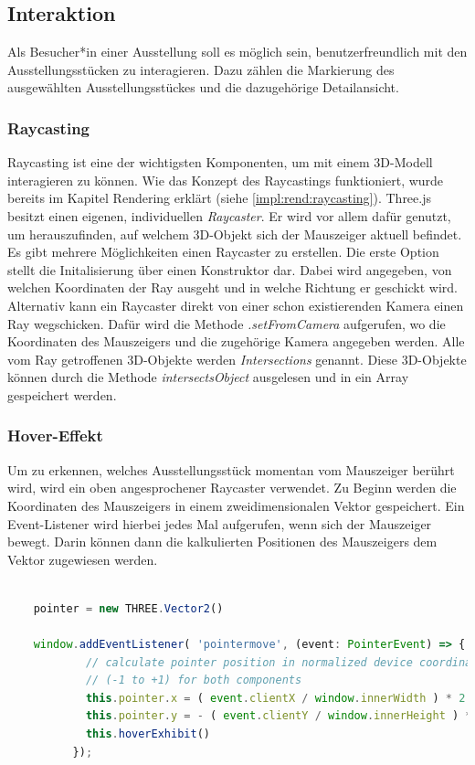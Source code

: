 \subsection{Interaktion}
Als Besucher*in einer Ausstellung soll es möglich sein, benutzerfreundlich mit den Ausstellungsstücken zu interagieren. Dazu zählen die Markierung des ausgewählten Ausstellungsstückes und die dazugehörige Detailansicht. 

\subsubsection{Raycasting}
\label{impl:int:raycasting}
Raycasting ist eine der wichtigsten Komponenten, um mit einem 3D-Modell interagieren zu können. Wie das Konzept des Raycastings funktioniert, wurde bereits im Kapitel Rendering erklärt (siehe \ref{impl:rend:raycasting}). Three.js besitzt einen eigenen, individuellen \emph{Raycaster}. Er wird vor allem dafür genutzt, um herauszufinden, auf welchem 3D-Objekt sich der Mauszeiger aktuell befindet. Es gibt mehrere Möglichkeiten einen Raycaster zu erstellen. Die erste Option stellt die Initalisierung über einen Konstruktor dar. Dabei wird angegeben, von welchen Koordinaten der Ray ausgeht und in welche Richtung er geschickt wird. Alternativ kann ein Raycaster direkt von einer schon existierenden Kamera einen Ray wegschicken. Dafür wird die Methode \emph{.setFromCamera} aufgerufen, wo die Koordinaten des Mauszeigers und die zugehörige Kamera angegeben werden. Alle vom Ray getroffenen 3D-Objekte werden \emph{Intersections} genannt. Diese 3D-Objekte können durch die Methode \emph{intersectsObject} ausgelesen und in ein Array gespeichert werden.
\cite{ThreeJSRaycaster}

\subsubsection{Hover-Effekt}
Um zu erkennen, welches Ausstellungsstück momentan vom Mauszeiger berührt wird, wird ein oben angesprochener Raycaster verwendet. Zu Beginn werden die Koordinaten des Mauszeigers in einem zweidimensionalen Vektor gespeichert. Ein Event-Listener wird hierbei jedes Mal aufgerufen, wenn sich der Mauszeiger bewegt. Darin können dann die kalkulierten Positionen des Mauszeigers dem Vektor zugewiesen werden.

\begin{lstlisting}[caption={Aktuelle Koordinaten des Mauszeigers einem 2D-Vektor zuweisen},language=TypeScript]
    
    pointer = new THREE.Vector2()

    window.addEventListener( 'pointermove', (event: PointerEvent) => {
            // calculate pointer position in normalized device coordinates
            // (-1 to +1) for both components
            this.pointer.x = ( event.clientX / window.innerWidth ) * 2 - 1
            this.pointer.y = - ( event.clientY / window.innerHeight ) * 2 + 1
            this.hoverExhibit()
          });
    
    
        \end{lstlisting}

